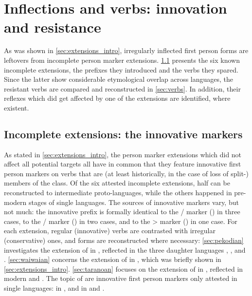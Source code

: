 \section{Inflections and verbs: innovation and resistance}
\label{sec:data}
As was shown in \cref{sec:extensions_intro}, irregularly inflected first person forms are leftovers from incomplete person marker extensions.
\cref{sec:extensions} presents the six known incomplete extensions, the prefixes they introduced and the verbs they spared.
Since the latter show considerable etymological overlap across languages, the resistant verbs are compared and reconstructed in \cref{sec:verbs}.
In addition, their reflexes which did get affected by one of the extensions are identified, where existent.

\subsection{Incomplete extensions: the innovative \texorpdfstring{}{Sa} markers}
\label{sec:extensions}
As stated in \cref{sec:extensions_intro}, the person marker extensions which did not affect all potential targets all have in common that they feature innovative first person markers on verbs that are (at least historically, in the case of loss of split-) members of the  class.
Of the six attested incomplete extensions, half can be reconstructed to intermediate proto-languages, while the others happened in pre-modern stages of single languages.
The sources of innovative markers vary, but not much: the innovative  prefix is formally identical to the / marker (\PC {}) in three cases, to the / marker (\PC {}) in two cases, and to the > marker (\PC {}) in one case.
For each extension, regular (innovative) verbs are contrasted with irregular (conservative) ones, and forms are reconstructed where necessary:
\cref{sec:pekodian} investigates the extension of  in \PPek, reflected in the three daughter languages \arara, \ikpeng, and \bakairi.
\cref{sec:waiwaian} concerns the extension of  in \PWai, which was briefly shown in \cref{sec:extensions_intro}.
\cref{sec:taranoan} focuses on the extension of  in \PTir, reflected in modern \trio and \akuriyo.
The topic of  are innovative first person markers only attested in single languages:
 in \akuriyo, and  in \carijo and \yukpa.
 
